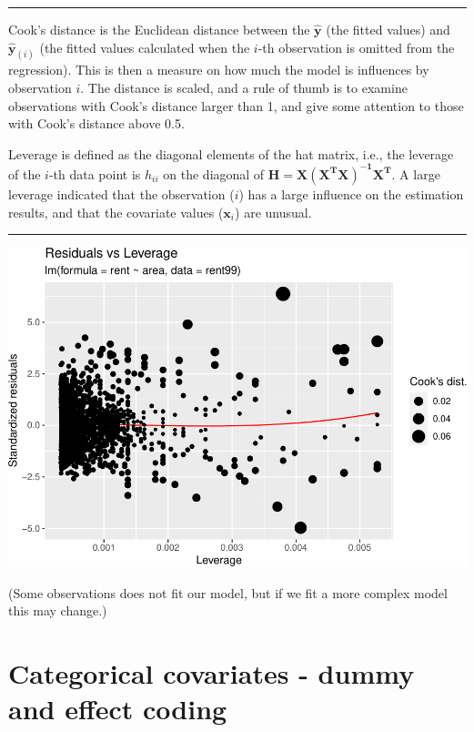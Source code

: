 \documentclass[
]{article}
\begin{document}
\begin{center}\rule{0.5\linewidth}{0.5pt}\end{center}

Cook's distance is the Euclidean distance between the
\(\mathbf{\hat{y}}\) (the fitted values) and \(\mathbf{\hat{y}}_{(i)}\)
(the fitted values calculated when the \(i\)-th observation is omitted
from the regression). This is then a measure on how much the model is
influences by observation \(i\). The distance is scaled, and a rule of
thumb is to examine observations with Cook's distance larger than 1, and
give some attention to those with Cook's distance above 0.5.

Leverage is defined as the diagonal elements of the hat matrix, i.e.,
the leverage of the \(i\)-th data point is \(h_{ii}\) on the diagonal of
\(\mathbf{H = X(X^TX)^{-1}X^T}\). A large leverage indicated that the
observation (\(i\)) has a large influence on the estimation results, and
that the covariate values (\(\mathbf{x}_i\)) are unusual.

\begin{center}\rule{0.5\linewidth}{0.5pt}\end{center}

\includegraphics{2MLR_files/figure-latex/unnamed-chunk-13-1.pdf}

(Some observations does not fit our model, but if we fit a more complex
model this may change.)

\hypertarget{categorical-covariates---dummy-and-effect-coding}{%
\section{Categorical covariates - dummy and effect
coding}\label{categorical-covariates---dummy-and-effect-coding}}
\end{document}
